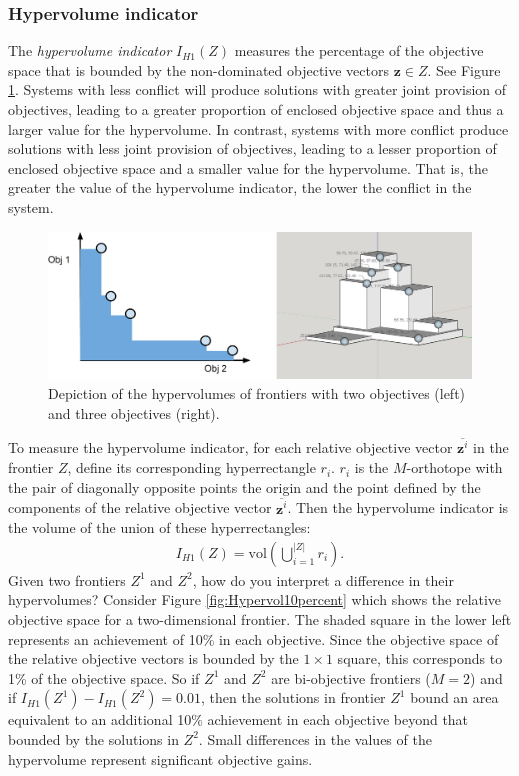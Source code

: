 \subsubsection{Hypervolume indicator}
The \textit{hypervolume indicator} $I_{H1}(Z)$ measures the percentage of the objective space that is bounded by the non-dominated objective vectors $\mathbf{z} \in Z$. See Figure \ref{fig:frontierVolumes}. Systems with less conflict will produce solutions with greater joint provision of objectives, leading to a greater proportion of enclosed objective space and thus a larger value for the hypervolume. In contrast, systems with more conflict produce solutions with less joint provision of objectives, leading to a lesser proportion of enclosed objective space and a smaller value for the hypervolume. That is, the greater the value of the hypervolume indicator, the lower the conflict in the system.

\begin{figure}[ht]
\centering
\includegraphics[width=.85\textwidth]{../images/FrontierVolumesNo2DOutlines}
\caption[Hypervolume of Pareto frontiers]{Depiction of the hypervolumes of frontiers with two objectives (left) and three objectives (right).}
\label{fig:frontierVolumes}
\end{figure}

To measure the hypervolume indicator, for each relative objective vector $\overbar{\mathbf{z}^i}$ in the frontier $Z$, define its corresponding hyperrectangle $r_i$. $r_i$ is the $M$-orthotope with the pair of diagonally opposite points the origin and the point defined by the components of the relative objective vector $\overbar{\mathbf{z}^i}$. Then the hypervolume indicator is the volume of the union of these hyperrectangles:
\begin{align}
I_{H1}(Z) = \text{vol} \left( \bigcup_{i = 1}^{|Z|} r_i \right). \label{eqn:hypervol}
\end{align}
Given two frontiers $Z^1$ and $Z^2$, how do you interpret a difference in their hypervolumes? Consider Figure \ref{fig:Hypervol10percent} which shows the relative objective space for a two-dimensional frontier. The shaded square in the lower left represents an achievement of 10\% in each objective. Since the objective space of the relative objective vectors is bounded by the $1 \times 1$ square, this corresponds to 1\% of the objective space. So if $Z^1$ and $Z^2$ are bi-objective frontiers ($M=2$) and if $I_{H1}(Z^1) - I_{H1}(Z^2) = 0.01$, then the solutions in frontier $Z^1$ bound an area equivalent to an additional 10\% achievement in each objective beyond that bounded by the solutions in $Z^2$. Small differences in the values of the hypervolume represent significant objective gains.

